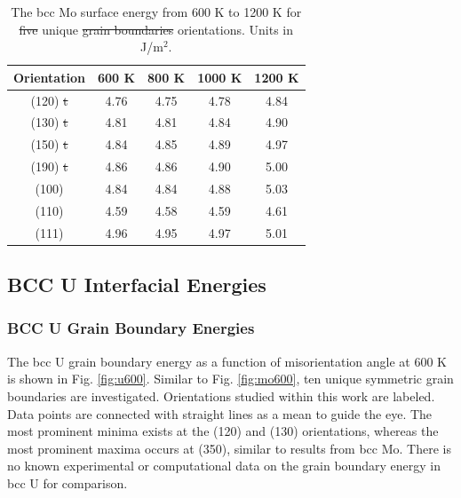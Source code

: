 \documentclass[review]{elsarticle}
\providecommand{\DIFaddtex}[1]{{\protect\color{blue}\uwave{#1}}} %
\providecommand{\DIFdeltex}[1]{{\protect\color{red}\sout{#1}}}                      %
\providecommand{\DIFaddFL}[1]{\DIFadd{#1}} %
\providecommand{\DIFdelFL}[1]{\DIFdel{#1}} %
\providecommand{\DIFaddbeginFL}{} %
\providecommand{\DIFaddendFL}{} %
\providecommand{\DIFdelbeginFL}{} %
\providecommand{\DIFdelendFL}{} %
\providecommand{\DIFadd}[1]{\texorpdfstring{\DIFaddtex{#1}}{#1}} %
\providecommand{\DIFdel}[1]{\texorpdfstring{\DIFdeltex{#1}}{}} %
\newcommand{\DIFscaledelfig}{0.5}
\newlength{\DIFdelgraphicswidth} %
\newlength{\DIFdelgraphicsheight} %
\newcommand{\DIFaddincludegraphics}[2][]{{\color{blue}\fbox{\DIFOincludegraphics[#1]{#2}}}} %
\newcommand{\DIFdelincludegraphics}[2][]{%
\sbox{\DIFdelgraphicsbox}{\DIFOincludegraphics[#1]{#2}}%
\settoboxwidth{\DIFdelgraphicswidth}{\DIFdelgraphicsbox} %
\settoboxtotalheight{\DIFdelgraphicsheight}{\DIFdelgraphicsbox} %
\scalebox{\DIFscaledelfig}{%
\parbox[b]{\DIFdelgraphicswidth}{\usebox{\DIFdelgraphicsbox}\\[-\baselineskip] \rule{\DIFdelgraphicswidth}{0em}}\llap{\resizebox{\DIFdelgraphicswidth}{\DIFdelgraphicsheight}{%
\setlength{\unitlength}{\DIFdelgraphicswidth}%
\begin{picture}(1,1)%
\thicklines\linethickness{2pt} %
{\color[rgb]{1,0,0}\put(0,0){\framebox(1,1){}}}%
{\color[rgb]{1,0,0}\put(0,0){\line( 1,1){1}}}%
{\color[rgb]{1,0,0}\put(0,1){\line(1,-1){1}}}%
\end{picture}%
}\hspace*{3pt}}} %
} %
\DeclareRobustCommand{\DIFaddbeginFL}{\DIFOaddbeginFL \let\includegraphics\DIFaddincludegraphics} %
\DeclareRobustCommand{\DIFaddendFL}{\DIFOaddendFL \let\includegraphics\DIFOincludegraphics} %
\DeclareRobustCommand{\DIFdelbeginFL}{\DIFOdelbeginFL \let\includegraphics\DIFdelincludegraphics} %
\DeclareRobustCommand{\DIFdelendFL}{\DIFOaddendFL \let\includegraphics\DIFOincludegraphics} %
\begin{document}
\begin{table}[h]
\caption{The bcc Mo surface energy from 600 K to 1200 K for \DIFdelbeginFL \DIFdelFL{five }\DIFdelendFL \DIFaddbeginFL \DIFaddFL{seven }\DIFaddendFL unique \DIFdelbeginFL \DIFdelFL{grain boundaries }\DIFdelendFL \DIFaddbeginFL \DIFaddFL{surface }\DIFaddendFL orientations. Units in J/m$^{2}$. } \label{tab:mosurf}
\begin{center}
\begin{tabular}{|c|c|c|c|c|}
	\hline
	Orientation & 600 K & 800 K & 1000 K & 1200 K \\
	 \hline
	 (120) \DIFdelbeginFL \DIFdelFL{t }\DIFdelendFL & 4.76 & 4.75 & 4.78 & 4.84 \\
	 (130) \DIFdelbeginFL \DIFdelFL{t }\DIFdelendFL & 4.81 & 4.81 & 4.84 & 4.90 \\
	 (150) \DIFdelbeginFL \DIFdelFL{t }\DIFdelendFL & 4.84 & 4.85 & 4.89 & 4.97 \\
	 (190) \DIFdelbeginFL \DIFdelFL{t }\DIFdelendFL & 4.86 & 4.86 & 4.90 & 5.00 \\
	 (100) & 4.84 & 4.84 & 4.88 & 5.03 \\
	 (110) & 4.59 & 4.58 & 4.59 & 4.61 \\
	 (111) & 4.96 & 4.95 & 4.97 & 5.01 \\	 
	 \hline
\end{tabular}
\end{center}
\label{default}
\end{table}

\FloatBarrier



\subsection{BCC U Interfacial Energies}
\subsubsection{BCC U Grain Boundary Energies}

The bcc U grain boundary energy as a function of misorientation angle at 600 K is shown in Fig. \ref{fig:u600}. Similar to Fig. \ref{fig:mo600}, ten unique symmetric grain boundaries are investigated. Orientations studied within this work are labeled. Data points are connected with straight lines as a mean to guide the eye. The most prominent minima exists at the (120) and (130) orientations, whereas the most prominent maxima occurs at (350), similar to results from bcc Mo. There is no known experimental or computational data on the grain boundary energy in bcc U for comparison.
\end{document}

